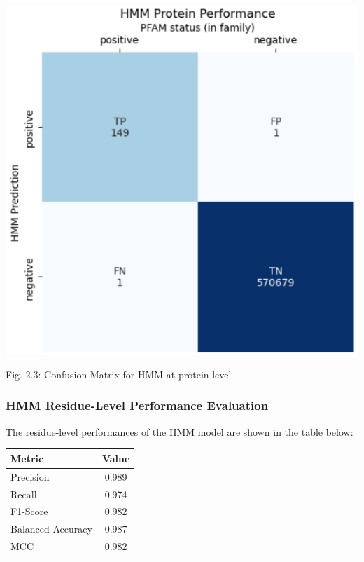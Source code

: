 \documentclass[10pt,twocolumn,letterpaper]{article}
\begin{document}
\begin{center}
    \includegraphics[scale=0.45]{report/img/hmm_prot_performance.png}
\end{center}

\begin{center}
    \small{Fig. 2.3: Confusion Matrix for HMM at protein-level}
\end{center}

\subsubsection{HMM Residue-Level Performance Evaluation}

The residue-level performances of the HMM model are shown in the table below:

\begin{center}
    \begin{tabular}{lc}
        \toprule
        Metric & Value \\
        \midrule
        Precision & 0.989 \\
        Recall & 0.974 \\
        F1-Score & 0.982 \\
        Balanced Accuracy & 0.987 \\
        MCC & 0.982 \\
        \bottomrule
    \end{tabular}
\end{center} \\
\end{document}

